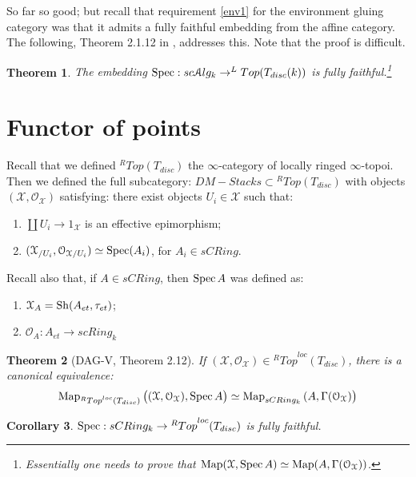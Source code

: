 \documentclass[10pt,a4paper,reqno,oneside]{book} %
\theoremstyle{plain}
\newtheorem{thm}{Theorem}[section]
\newtheorem{cor}[thm]{Corollary}
\theoremstyle{definition}
\theoremstyle{remark}
\numberwithin{equation}{section}
\begin{document}
So far so good; but recall that requirement \ref{env1} for the environment gluing category was that it admits a fully
faithful embedding from the affine category. The following, Theorem 2.1.12 in \cite{DAG-V}, addresses this. Note that
the proof is difficult.

\begin{thm}
The embedding $\operatorname{Spec} : sc\mathcal A lg_k \to ^L Top(T_{disc}(k))$ is fully faithful.\footnote{Essentially one needs to prove that
$\operatorname{Map}(\mathcal{X}, \operatorname{Spec} A) \simeq \operatorname{Map}(A, \Gamma(\mathcal{O}_{\mathcal{X}}))$.}
\end{thm}



\section{Functor of points}
Recall that we defined $^R Top(T_{disc})$ the $\infty$-category of locally ringed $\infty$-topoi. Then we defined the
full subcategory: $DM-Stacks \subset {^R Top}(T_{disc})$ with objects $(\mathcal{X},\mathcal{O}_{\mathcal{X}})$ satisfying:
there exist objects $U_i \in \mathcal{X}$ such that:
\begin{enumerate}
\item $\coprod U_i \to 1_{\mathcal{X}}$ is an effective epimorphism;
\item $(\mathcal{X}_{/U_i}, \mathcal{O}_{\mathcal{X}/U_i}) \simeq \operatorname{Spec} (A_i)$, for $A_i \in sCRing$.
\end{enumerate}

Recall also that, if $A \in sCRing$, then $\operatorname{Spec} A$ was defined as:
\begin{enumerate}
\item $\mathcal{X}_A = \mathrm{Sh} (A_{et}, \tau_{et})$;
\item $\mathcal{O}_A : A_{et} \to scRing_k$
\end{enumerate}

\begin{thm}[DAG-V, Theorem 2.12]
If $(\mathcal{X},\mathcal{O}_{\mathcal{X}}) \in {^R Top}^{loc}(T_{disc})$, there is a canonical equivalence:
\[	\operatorname{Map}_{{^R Top}^{loc}(T_{disc})}\big( (\mathcal{X},\mathcal{O}_{\mathcal{X}}), \operatorname{Spec} A\big)
\simeq \operatorname{Map}_{sCRing_k}\big.(A,\Gamma(\mathcal{O}_{\mathcal{X}})\big)	\]
\end{thm}

\begin{cor}
$\operatorname{Spec} : sCRing_k \to {^R Top}^{loc}(T_{disc})$ is fully faithful.
\end{cor}
\end{document}
